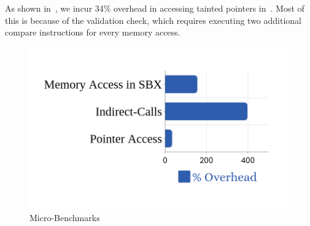 As shown in~, we incur 34\% overhead in accessing tainted pointers in~\cregion.
Most of this is because of the validation check, which requires executing two additional compare instructions for every memory access.

\begin{figure}[h!]
\includegraphics[width=1.0\linewidth]{images/microbenchmark.png}
\caption{\systemname Micro-Benchmarks}
\label{fig:microbenchmarks}
\end{figure}



